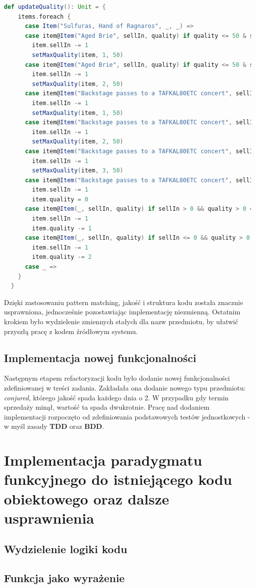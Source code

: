 \documentclass[a4paper, 11pt]{article}
\begin{document}
\begin{lstlisting}[language=scala]
  def updateQuality(): Unit = {
    items.foreach {
      case Item("Sulfuras, Hand of Ragnaros", _, _) =>
      case item@Item("Aged Brie", sellIn, quality) if quality <= 50 & sellIn >= 0 =>
        item.sellIn -= 1
        setMaxQuality(item, 1, 50)
      case item@Item("Aged Brie", sellIn, quality) if quality <= 50 & sellIn < 0 =>
        item.sellIn -= 1
        setMaxQuality(item, 2, 50)
      case item@Item("Backstage passes to a TAFKAL80ETC concert", sellIn, quality) if quality < 50 && sellIn > 10 =>
        item.sellIn -= 1
        setMaxQuality(item, 1, 50)
      case item@Item("Backstage passes to a TAFKAL80ETC concert", sellIn, quality) if quality < 50 && sellIn > 5 =>
        item.sellIn -= 1
        setMaxQuality(item, 2, 50)
      case item@Item("Backstage passes to a TAFKAL80ETC concert", sellIn, quality) if quality < 50 && sellIn > 0 =>
        item.sellIn -= 1
        setMaxQuality(item, 3, 50)
      case item@Item("Backstage passes to a TAFKAL80ETC concert", sellIn, _) if sellIn <= 0 =>
        item.sellIn -= 1
        item.quality = 0
      case item@Item(_, sellIn, quality) if sellIn > 0 && quality > 0 =>
        item.sellIn -= 1
        item.quality -= 1
      case item@Item(_, sellIn, quality) if sellIn <= 0 && quality > 0 =>
        item.sellIn -= 1
        item.quality -= 2
      case _ =>
    }
  }
\end{lstlisting}
Dzięki zastosowaniu pattern matching, jakość i struktura kodu została znacznie usprawniona, jednocześnie pozostawiając implementację niezmienną. Ostatnim krokiem było wydzielenie zmiennych stałych dla nazw przedmiotu, by ułatwić przyszłą pracę z kodem źródłowym systemu.
\subsection{Implementacja nowej funkcjonalności}
Następnym etapem refactoryzacji kodu było dodanie nowej funkcjonalności zdefiniowanej w treści zadania. Zakładała ona dodanie nowego typu przedmiotu: \textit{conjured}, którego jakość spada każdego dnia o 2. W przypadku gdy termin sprzedaży minął, wartość ta spada dwukrotnie.
Pracę nad dodaniem implementacji rozpoczęto od zdefiniowania podstawowych testów jednostkowych - w myśl zasady \textbf{TDD} oraz \textbf{BDD}. 
\section{Implementacja paradygmatu funkcyjnego do istniejącego kodu obiektowego oraz dalsze usprawnienia}
\subsection{Wydzielenie logiki kodu}
\subsection{Funkcja jako wyrażenie}
\end{document}
